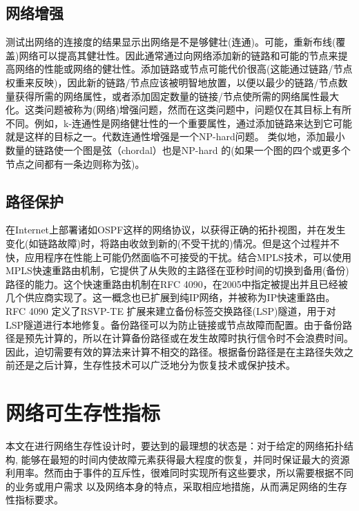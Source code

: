\subsection{网络增强}
测试出网络的连接度的结果显示出网络是不是够健壮(连通)。可能，重新布线(覆盖)网络可以提高其健壮性\cite{van2010influence}。因此通常通过向网络添加新的链路和可能的节点来提高网络的性能或网络的健壮性。添加链路或节点可能代价很高(这能通过链路/节点权重来反映)，因此新的链路/节点应该被明智地放置，以便以最少的链路/节点数量获得所需的网络属性，或者添加固定数量的链接/节点使所需的网络属性最大化。这类问题被称为(网络)增强问题，然而在这类问题中，问题仅在其目标上有所不同。例如，k-连通性是网络健壮性的一个重要属性，通过添加链路来达到它可能就是这样的目标之一。代数连通性增强是一个NP-hard问题\cite{mosk2008maximum}。 类似地，添加最小数量的链路使一个图是弦（chordal）也是NP-hard 的\cite{yannakakis1981computing}(如果一个图的四个或更多个节点之间都有一条边则称为弦)。
\subsection{路径保护}
在Internet上部署诸如OSPF这样的网络协议，以获得正确的拓扑视图，并在发生变化(如链路故障)时，将路由收敛到新的(不受干扰的)情况。但是这个过程并不快，应用程序在性能上可能仍然面临不可接受的干扰。结合MPLS技术，可以使用MPLS快速重路由机制，它提供了从失败的主路径在亚秒时间的切换到备用(备份)路径的能力。这个快速重路由机制在RFC 4090\cite{pan2005fast}，在2005中指定被提出并且已经被几个供应商实现了。这一概念也已扩展到纯IP网络，并被称为IP快速重路由\cite{shand2010ip}。RFC 4090 定义了RSVP-TE 扩展来建立备份标签交换路径(LSP)隧道，用于对LSP隧道进行本地修复。备份路径可以为防止链接或节点故障而配置。由于备份路径是预先计算的，所以在计算备份路径或在发生故障时执行信令时不会浪费时间。因此，迫切需要有效的算法来计算不相交的路径。根据备份路径是在主路径失效之前还是之后计算，生存性技术可以广泛地分为恢复技术或保护技术。

\section{网络可生存性指标}
本文在进行网络生存性设计时，要达到的最理想的状态是：对于给定的网络拓扑结构, 能够在最短的时间内使故障元素获得最大程度的恢复，并同时保证最大的资源利用率。然而由于事件的互斥性，很难同时实现所有这些要求，所以需要根据不同的业务或用户需求 以及网络本身的特点，采取相应地措施，从而满足网络的生存性指标要求。

